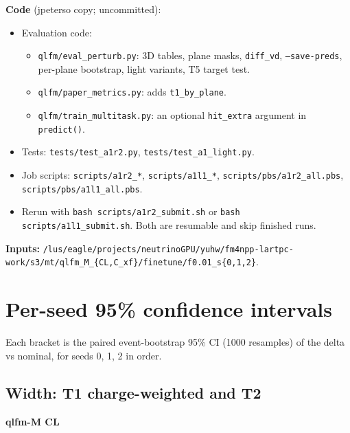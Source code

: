 \documentclass[10pt,a4paper]{article}
\begin{document}
\textbf{Code} (jpeterso copy; uncommitted):

\begin{itemize}
\item Evaluation code:
\begin{itemize}
\item \texttt{qlfm/\allowbreak{}eval\_\allowbreak{}perturb.py}: 3D tables, plane masks, \texttt{diff\_\allowbreak{}vd}, \texttt{--save-preds}, per-plane bootstrap, light variants, T5 target test.
\item \texttt{qlfm/\allowbreak{}paper\_\allowbreak{}metrics.py}: adds \texttt{t1\_\allowbreak{}by\_\allowbreak{}plane}.
\item \texttt{qlfm/\allowbreak{}train\_\allowbreak{}multitask.py}: an optional \texttt{hit\_\allowbreak{}extra} argument in \texttt{predict()}.
\end{itemize}
\item Tests: \texttt{tests/\allowbreak{}test\_\allowbreak{}a1r2.py}, \texttt{tests/\allowbreak{}test\_\allowbreak{}a1\_\allowbreak{}light.py}.
\item Job scripts: \texttt{scripts/\allowbreak{}a1r2\_\allowbreak{}*}, \texttt{scripts/\allowbreak{}a1l1\_\allowbreak{}*}, \texttt{scripts/\allowbreak{}pbs/\allowbreak{}a1r2\_\allowbreak{}all.pbs}, \texttt{scripts/\allowbreak{}pbs/\allowbreak{}a1l1\_\allowbreak{}all.pbs}.
\item Rerun with \texttt{bash scripts/\allowbreak{}a1r2\_\allowbreak{}submit.sh} or \texttt{bash scripts/\allowbreak{}a1l1\_\allowbreak{}submit.sh}. Both are resumable and skip finished runs.
\end{itemize}
\textbf{Inputs:} \texttt{/\allowbreak{}lus/\allowbreak{}eagle/\allowbreak{}projects/\allowbreak{}neutrinoGPU/\allowbreak{}yuhw/\allowbreak{}fm4npp-lartpc-work/\allowbreak{}s3/\allowbreak{}mt/\allowbreak{}qlfm\_\allowbreak{}M\_\allowbreak{}\{CL,C\_\allowbreak{}xf\}/\allowbreak{}finetune/\allowbreak{}f0.01\_\allowbreak{}s\{0,1,2\}}.

\appendix
\section{Per-seed 95\% confidence intervals}
Each bracket is the paired event-bootstrap 95\% CI (1000 resamples) of the delta vs nominal, for seeds 0, 1, 2 in order.

\subsection{Width: T1 charge-weighted and T2}
\textbf{qlfm-M CL}
\end{document}
